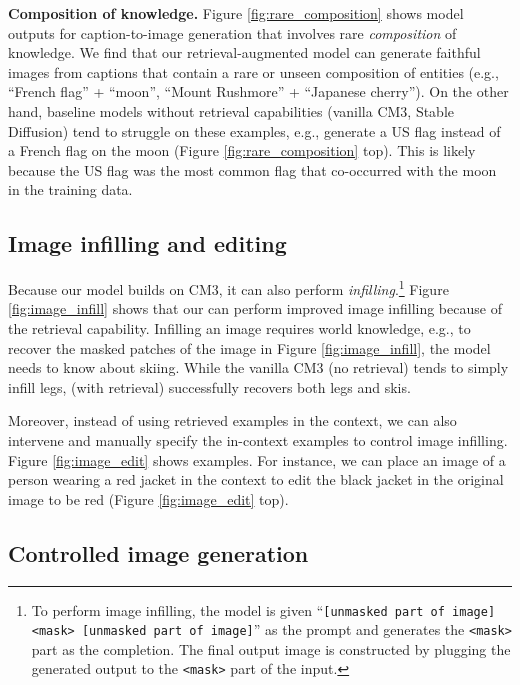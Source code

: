 \textbf{Composition of knowledge.} 
Figure \ref{fig:rare_composition} shows model outputs for caption-to-image generation that involves rare \textit{composition} of knowledge. 
We find that our retrieval-augmented model can generate faithful images from captions that contain a rare or unseen composition of entities (e.g., ``French flag'' + ``moon'', ``Mount Rushmore'' + ``Japanese cherry'').
On the other hand, baseline models without retrieval capabilities (vanilla CM3, Stable Diffusion) tend to struggle on these examples, e.g., generate a US flag instead of a French flag on the moon (Figure \ref{fig:rare_composition} top). This is likely because the US flag was the most common flag that co-occurred with the moon in the training data.





\subsection{Image infilling and editing}
\label{sec:result-image_infill}

Because our model builds on CM3, it can also perform \textit{infilling}.\footnote{To perform image infilling, the model is given ``\texttt{[unmasked part of image] <mask> [unmasked part of image]}'' as the prompt and generates the \texttt{<mask>} part as the completion. The final output image is constructed by plugging the generated output to the \texttt{<mask>} part of the input.} Figure \ref{fig:image_infill} shows that our \methodname can perform improved image infilling because of the retrieval capability. Infilling an image requires world knowledge, e.g., to recover the masked patches of the image in Figure \ref{fig:image_infill}, the model needs to know about skiing. While the vanilla CM3 (no retrieval) tends to simply infill legs, \methodname (with retrieval) successfully recovers both legs and skis. 

Moreover, instead of using retrieved examples in the \methodname context, we can also intervene and manually specify the in-context examples to control image infilling. Figure \ref{fig:image_edit} shows examples. For instance, we can place an image of a person wearing a red jacket in the context to edit the black jacket in the original image to be red (Figure \ref{fig:image_edit} top).


\subsection{Controlled image generation}
\label{sec:result-controlled}

